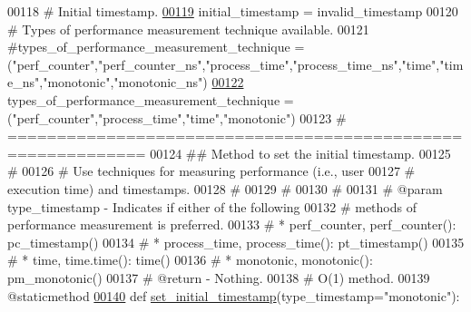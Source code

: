 \begin{DoxyCode}
00118     \textcolor{comment}{# Initial timestamp.}
\hypertarget{performance__measurement__no__ns_8py_source_l00119}{}\hyperlink{classutilities_1_1timing__measurements_1_1performance__measurement__no__ns_1_1execution__time__measurement_a75ac358ee6e04eba517fd6dd429c99a1}{00119}     initial\_timestamp = invalid\_timestamp
00120     \textcolor{comment}{# Types of performance measurement technique available.}
00121     \textcolor{comment}{#types\_of\_performance\_measurement\_technique =
       ("perf\_counter","perf\_counter\_ns","process\_time","process\_time\_ns","time","time\_ns","monotonic","monotonic\_ns")}
\hypertarget{performance__measurement__no__ns_8py_source_l00122}{}\hyperlink{classutilities_1_1timing__measurements_1_1performance__measurement__no__ns_1_1execution__time__measurement_aa73046ac445a5731739e52ae5034c4a1}{00122}     types\_of\_performance\_measurement\_technique = (\textcolor{stringliteral}{"perf\_counter"},\textcolor{stringliteral}{"process\_time"},\textcolor{stringliteral}{"time"},\textcolor{stringliteral}{"monotonic"})
00123     \textcolor{comment}{# ============================================================}
00124     \textcolor{comment}{##  Method to set the initial timestamp.}
00125     \textcolor{comment}{#}
00126     \textcolor{comment}{#   Use techniques for measuring performance (i.e., user}
00127     \textcolor{comment}{#       execution time) and timestamps.}
00128     \textcolor{comment}{#}
00129     \textcolor{comment}{#}
00130     \textcolor{comment}{#}
00131     \textcolor{comment}{#   @param type\_timestamp - Indicates if either of the following}
00132     \textcolor{comment}{#               methods of performance measurement is preferred.}
00133     \textcolor{comment}{#               * perf\_counter, perf\_counter(): pc\_timestamp()}
00134     \textcolor{comment}{#               * process\_time, process\_time(): pt\_timestamp()}
00135     \textcolor{comment}{#               * time, time.time(): time()}
00136     \textcolor{comment}{#               * monotonic, monotonic(): pm\_monotonic()}
00137     \textcolor{comment}{#   @return - Nothing.}
00138     \textcolor{comment}{#   O(1) method.}
00139     @staticmethod
\hypertarget{performance__measurement__no__ns_8py_source_l00140}{}\hyperlink{classutilities_1_1timing__measurements_1_1performance__measurement__no__ns_1_1execution__time__measurement_ac1a396608592993d871613a73d20b088}{00140}     \textcolor{keyword}{def }\hyperlink{classutilities_1_1timing__measurements_1_1performance__measurement__no__ns_1_1execution__time__measurement_ac1a396608592993d871613a73d20b088}{set\_initial\_timestamp}(type\_timestamp="monotonic"):

\end{DoxyCode}
